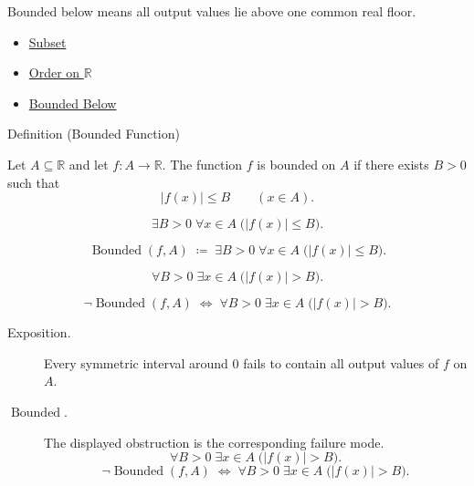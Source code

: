 \begin{remark*}[Interpretation]
Bounded below means all output values lie above one common real floor.
\end{remark*}

\begin{dependencies}
\begin{itemize}
  \item \hyperref[def:subset]{Subset}
  \item \hyperref[def:order-on-r]{Order on $\mathbb{R}$}
  \item \hyperref[def:bounded-below]{Bounded Below}
\end{itemize}
\end{dependencies}

\begin{definitionbox}{Definition (Bounded Function)}
\begin{definition}
\label{def:function-bounded}
Let $A\subseteq\mathbb{R}$ and let $f:A\to\mathbb{R}$.  The function
$f$ is bounded on $A$ if there exists $B>0$ such that
\[
  |f(x)|\leq B
  \qquad (x\in A).
\]
\end{definition}
\end{definitionbox}

\begin{remark*}
\[
  \exists B>0\;\forall x\in A\;\bigl(|f(x)|\leq B\bigr).
\]
\end{remark*}

\begin{remark*}
\[
  \operatorname{Bounded}(f,A)
  \;\coloneqq\;
  \exists B>0\;\forall x\in A\;\bigl(|f(x)|\leq B\bigr).
\]
\end{remark*}

\begin{remark*}
\[
  \forall B>0\;\exists x\in A\;\bigl(|f(x)|>B\bigr).
\]
\end{remark*}

\begin{remark*}
\[
  \neg\operatorname{Bounded}(f,A)
  \;\Longleftrightarrow\;
  \forall B>0\;\exists x\in A\;\bigl(|f(x)|>B\bigr).
\]
\end{remark*}

\begin{remark*}
\begin{description}
  \item[Exposition.]
Every symmetric interval around $0$ fails to contain all output values of
$f$ on $A$.


  \item[\(\operatorname{Bounded}.\)]
  The displayed obstruction is the corresponding failure mode.
  \[
  \forall B>0\;\exists x\in A\;\bigl(|f(x)|>B\bigr).
\]
  \[
  \neg\operatorname{Bounded}(f,A)
  \;\Longleftrightarrow\;
  \forall B>0\;\exists x\in A\;\bigl(|f(x)|>B\bigr).
\]
\end{description}
\end{remark*}

